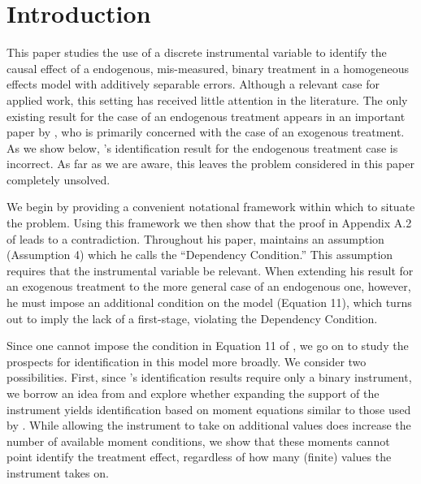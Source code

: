 \section{Introduction}

This paper studies the use of a discrete instrumental variable to identify the causal effect of a endogenous, mis-measured, binary treatment in a homogeneous effects model with additively separable errors.
Although a relevant case for applied work, this setting has received little attention in the literature.
The only existing result for the case of an endogenous treatment appears in an important paper by \cite{Mahajan}, who is primarily concerned with the case of an exogenous treatment.
As we show below, \citeauthor{Mahajan}'s identification result for the endogenous treatment case is incorrect.
As far as we are aware, this leaves the problem considered in this paper completely unsolved.

We begin by providing a convenient notational framework within which to situate the problem.
Using this framework we then show that the proof in Appendix A.2 of \cite{Mahajan} leads to a contradiction.
Throughout his paper, \cite{Mahajan} maintains an assumption (Assumption 4) which he calls the ``Dependency Condition.'' 
This assumption requires that the instrumental variable be relevant.
When extending his result for an exogenous treatment to the more general case of an endogenous one, however, he must impose an additional condition on the model (Equation 11), which turns out to imply the lack of a first-stage, violating the Dependency Condition.

Since one cannot impose the condition in Equation 11 of \cite{Mahajan}, we go on to study the prospects for identification in this model more broadly.
We consider two possibilities.
First, since \citeauthor{Mahajan}'s identification results require only a binary instrument,  we borrow an idea from \cite{Lewbel} and explore whether expanding the support of the instrument yields identification based on moment equations similar to those used by \cite{Mahajan}.
While allowing the instrument to take on additional values does increase the number of available moment conditions, we show that these moments cannot point identify the treatment effect, regardless of how many (finite) values the instrument takes on.

